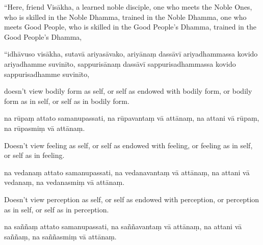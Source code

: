 \begin{samepage}
\begin{leftcolumn*}
“Here, friend Visākha, a learned noble disciple, one who meets the Noble Ones, who is skilled in the Noble Dhamma, trained in the Noble Dhamma, one who meets Good People, who is skilled in the Good People’s Dhamma, trained in the Good People’s Dhamma,
\end{leftcolumn*}

\begin{rightcolumn}
“idhāvuso visākha, sutavā ariyasāvako, ariyānaṃ dassāvī ariyadhammassa kovido ariyadhamme suvinīto, sappurisānaṃ dassāvī sappurisadhammassa kovido sappurisadhamme suvinīto,
\end{rightcolumn}
\end{samepage}

\begin{samepage}
\begin{leftcolumn*}
doesn’t view bodily form as self, or self as endowed with bodily form, or bodily form as in self, or self as in bodily form.
\end{leftcolumn*}

\begin{rightcolumn}
na rūpaṃ attato samanupassati, na rūpavantaṃ vā attānaṃ, na attani vā rūpaṃ, na rūpasmiṃ vā attānaṃ.
\end{rightcolumn}
\end{samepage}

\begin{samepage}
\begin{leftcolumn*}
Doesn’t view feeling as self, or self as endowed with feeling, or feeling as in self, or self as in feeling.
\end{leftcolumn*}

\begin{rightcolumn}
na vedanaṃ attato samanupassati, na vedanavantaṃ vā attānaṃ, na attani vā vedanaṃ, na vedanasmiṃ vā attānaṃ.
\end{rightcolumn}
\end{samepage}

\begin{samepage}
\begin{leftcolumn*}
Doesn’t view perception as self, or self as endowed with perception, or perception as in self, or self as in perception.
\end{leftcolumn*}

\begin{rightcolumn}
na saññaṃ attato samanupassati, na saññavantaṃ vā attānaṃ, na attani vā saññaṃ, na saññasmiṃ vā attānaṃ.
\end{rightcolumn}
\end{samepage}

